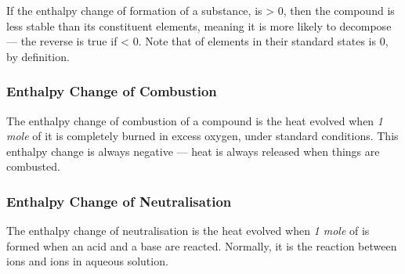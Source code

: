 
			If the enthalpy change of formation of a substance,  is > 0, then the compound is less stable than its constituent elements,
			meaning it is more likely to decompose --- the reverse is true if  < 0. Note that  of elements in their standard
			states is 0, by definition.


		\subsubsection{Enthalpy Change of Combustion}
			The enthalpy change of combustion of a compound is the heat evolved when \emph{1 mole} of it is completely burned in excess
			oxygen, under standard conditions. This enthalpy change is always negative --- heat is always released when things are combusted.



		\subsubsection{Enthalpy Change of Neutralisation}

			The enthalpy change of neutralisation is the heat evolved when \emph{1 mole} of  is formed when an acid and a base are
			reacted. Normally, it is the reaction between  ions and  ions in aqueous solution.



